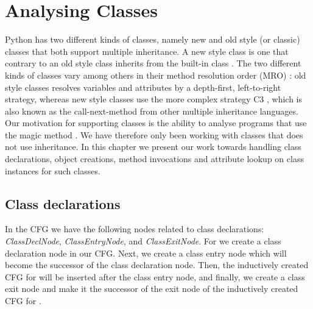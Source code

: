 \chapter{Analysing Classes}
Python has two different kinds of classes, namely new and old style (or classic) classes that both support multiple inheritance. A new style class is one that contrary to an old style class inherits from the built-in class . The two different kinds of classes vary among others in their method resolution order (MRO) \cite{pyref.typehierarchy}: old style classes resolves variables and attributes by a depth-first, left-to-right strategy, whereas new style classes use the more complex strategy C3 \cite{pyref.c3mro}, which is also known as the call-next-method from other multiple inheritance languages. Our motivation for supporting classes is the ability to analyse programs that use the magic method . We have therefore only been working with classes that does not use inheritance. In this chapter we present our work towards handling class declarations, object creations, method invocations and attribute lookup on class instances for such classes.





\section{Class declarations}
In the CFG we have the following nodes related to class declarations: \textit{ClassDeclNode}, \textit{ClassEntryNode}, and \textit{ClassExitNode}. For  we create a class declaration node in our CFG. Next, we create a class entry node which will become the successor of the class declaration node. Then, the inductively created CFG for  will be inserted after the class entry node, and finally, we create a class exit node and make it the successor of the exit node of the inductively created CFG for .

